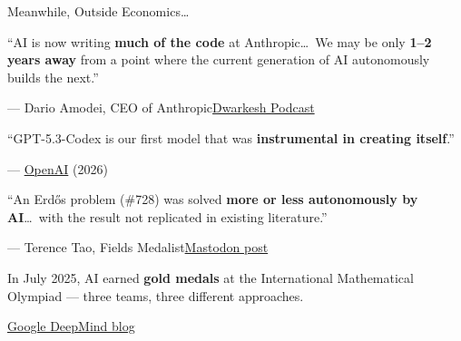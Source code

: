 \documentclass[aspectratio=169, 11pt]{beamer}
\newcommand{\emphgold}[1]{\alert{\textbf{#1}}}
\begin{document}
\begin{frame}{Meanwhile, Outside Economics\ldots}
\begin{tcolorbox}[enhanced, colback=lightgray, colframe=lightgray, boxrule=0pt,
  borderline west={3pt}{0pt}{accentorange}, sharp corners,
  left=8pt, right=8pt, top=3pt, bottom=3pt]
\footnotesize
``AI is now writing \emphgold{much of the code} at Anthropic\ldots\ We may be only \emphgold{1--2 years away} from a point where the current generation of AI autonomously builds the next.''
\end{tcolorbox}
\vspace{-0.2cm}
\hfill\textcolor{medgray}{\scriptsize --- Dario Amodei, CEO of Anthropic\quad\href{https://www.dwarkeshpatel.com/p/dario-amodei}{Dwarkesh Podcast}}
\vspace{-0.1cm}
\begin{tcolorbox}[enhanced, colback=lightgray, colframe=lightgray, boxrule=0pt,
  borderline west={3pt}{0pt}{accentorange}, sharp corners,
  left=8pt, right=8pt, top=3pt, bottom=3pt]
\footnotesize
``GPT-5.3-Codex is our first model that was \emphgold{instrumental in creating itself}.''
\end{tcolorbox}
\vspace{-0.2cm}
\hfill\textcolor{medgray}{\scriptsize --- \href{https://openai.com/index/introducing-gpt-5-3-codex/}{OpenAI} (2026)}
\vspace{-0.1cm}
\begin{tcolorbox}[enhanced, colback=lightgray, colframe=lightgray, boxrule=0pt,
  borderline west={3pt}{0pt}{accentorange}, sharp corners,
  left=8pt, right=8pt, top=3pt, bottom=3pt]
\footnotesize
``An Erd\H{o}s problem (\#728) was solved \emphgold{more or less autonomously by AI}\ldots\ with the result not replicated in existing literature.''
\end{tcolorbox}
\vspace{-0.2cm}
\hfill\textcolor{medgray}{\scriptsize --- Terence Tao, Fields Medalist\quad\href{https://mathstodon.xyz/@tao/115855840223258103}{Mastodon post}}
\vspace{-0.1cm}
\begin{tcolorbox}[enhanced, colback=lightgray, colframe=lightgray, boxrule=0pt,
  borderline west={3pt}{0pt}{accentorange}, sharp corners,
  left=8pt, right=8pt, top=3pt, bottom=3pt]
\footnotesize
In July 2025, AI earned \emphgold{gold medals} at the International Mathematical Olympiad --- three teams, three different approaches.
\end{tcolorbox}
\vspace{-0.2cm}
\hfill\textcolor{medgray}{\scriptsize\href{https://deepmind.google/blog/advanced-version-of-gemini-with-deep-think-officially-achieves-gold-medal-standard-at-the-international-mathematical-olympiad/}{Google DeepMind blog}}
\end{frame}
\end{document}
